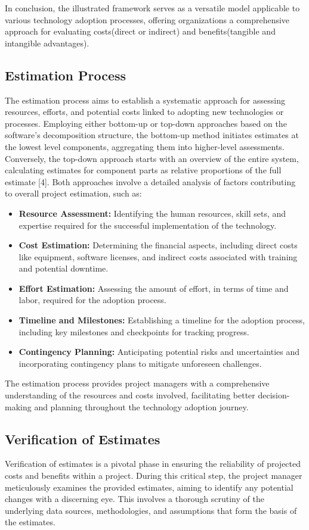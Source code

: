 \documentclass{article}
\begin{document}
\noindent In conclusion, the illustrated framework serves as a versatile model applicable to various technology adoption processes, offering organizations a comprehensive approach for evaluating costs(direct or indirect) and benefits(tangible and intangible advantages).

\subsection{Estimation Process}
The estimation process aims to establish a systematic approach for assessing resources, efforts, and potential costs linked to adopting new technologies or processes. Employing either bottom-up or top-down approaches based on the software's decomposition structure, the bottom-up method initiates estimates at the lowest level components, aggregating them into higher-level assessments. Conversely, the top-down approach starts with an overview of the entire system, calculating estimates for component parts as relative proportions of the full estimate [4]. Both approaches involve a detailed analysis of factors contributing to overall project estimation, such as:
\begin{itemize}
    \item \textbf{Resource Assessment:} Identifying the human resources, skill sets, and expertise required for the successful implementation of the technology.
    \item \textbf{Cost Estimation:} Determining the financial aspects, including direct costs like equipment, software licenses, and indirect costs associated with training and potential downtime.
    \item \textbf{Effort Estimation:} Assessing the amount of effort, in terms of time and labor, required for the adoption process.
    \item \textbf{Timeline and Milestones:} Establishing a timeline for the adoption process, including key milestones and checkpoints for tracking progress.
    \item \textbf{Contingency Planning:} Anticipating potential risks and uncertainties and incorporating contingency plans to mitigate unforeseen challenges.
\end{itemize}

\noindent The estimation process provides project managers with a comprehensive understanding of the resources and costs involved, facilitating better decision-making and planning throughout the technology adoption journey.


\subsection{Verification of Estimates}
Verification of estimates is a pivotal phase in ensuring the reliability of projected costs and benefits within a project. During this critical step, the project manager meticulously examines the provided estimates, aiming to identify any potential changes with a discerning eye. This involves a thorough scrutiny of the underlying data sources, methodologies, and assumptions that form the basis of the estimates.\newline
\end{document}
